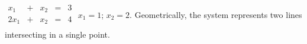{$\begin{array}{ccccc}
x_1&+&x_2&=&3\\
2x_1&+&x_2&=&4\\
\end{array}$}
{$x_1=1$; $x_2=2$. Geometrically, the system represents two lines intersecting in a single point.}